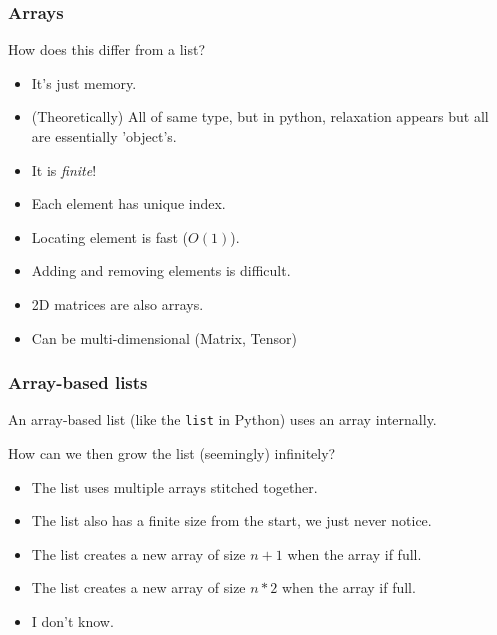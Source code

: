 \begin{frame}
	\frametitle{Arrays}

	
			How does this differ from a list?

			\begin{itemize}
				\item It's just memory.
				\item (Theoretically) All of same type, but in python, relaxation appears but all are essentially 'object's.
				\item It is \textit{finite}!
				\item Each element has unique index.
				\item Locating element is fast ($O(1)$).
				\item Adding and removing elements is difficult.
				\item 2D matrices are also arrays.
				\item Can be multi-dimensional (Matrix, Tensor)
			\end{itemize}


\end{frame}

\begin{frame}
	\frametitle{Array-based lists}

		An array-based list (like the \texttt{list} in Python) uses an array internally.

		How can we then grow the list (seemingly) infinitely?
		\begin{itemize}
			\item The list uses multiple arrays stitched together.
			\item The list also has a finite size from the start, we just never notice.
			\item The list creates a new array of size $n+1$ when the array if full.
			\item The list creates a new array of size $n*2$ when the array if full.
			\item I don't know.
		\end{itemize}

\end{frame}

